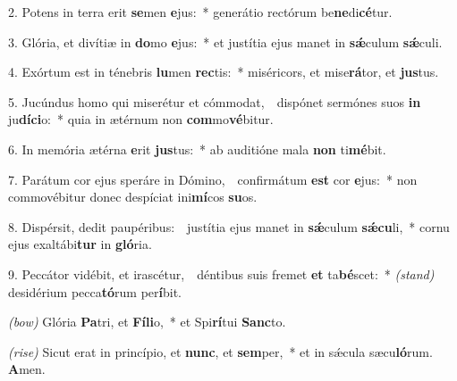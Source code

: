 2. Potens in terra erit \textbf{se}men \textbf{e}jus:~* generátio rectórum be\textbf{ne}di\textbf{cé}tur.

3. Glória, et divítiæ in \textbf{do}mo \textbf{e}jus:~* et justítia ejus manet in \textbf{s\'{\ae}}culum \textbf{s\'{\ae}}culi.

4. Exórtum est in ténebris \textbf{lu}men \textbf{rec}tis:~* miséricors, et mise\textbf{rá}tor, et \textbf{jus}tus.

5. Jucúndus homo qui miserétur et cómmodat,~\GreDagger\ dispónet sermónes suos \textbf{in} ju\textbf{dí}\textbf{ci}o:~* quia in ætérnum non \textbf{com}mo\textbf{vé}bitur.

6. In memória ætérna \textbf{e}rit \textbf{jus}tus:~* ab auditióne mala \textbf{non} ti\textbf{mé}bit.

7. Parátum cor ejus speráre in Dómino,~\GreDagger\ confirmátum \textbf{est} cor \textbf{e}jus:~* non commovébitur donec despíciat ini\textbf{mí}cos \textbf{su}os.

8. Dispérsit, dedit paupéribus:~\GreDagger\ justítia ejus manet in \textbf{s\'{\ae}}culum \textbf{s\'{\ae}}\-\textbf{cu}li,~* cornu ejus exaltábi\textbf{tur} in \textbf{gló}ria.

9. Peccátor vidébit, et irascétur,~\GreDagger\ déntibus suis fremet \textbf{et} ta\textbf{bé}scet:~* {\color{red}\textit{(stand)}} desidérium pecca\textbf{tó}rum per\textbf{í}bit.

{\color{red}\textit{(bow)}} Glória \textbf{Pa}tri, et \textbf{Fí}\textbf{li}o,~* et Spi\textbf{rí}tui \textbf{Sanc}to.

{\color{red}\textit{(rise)}} Sicut erat in princípio, et \textbf{nunc}, et \textbf{sem}per,~* et in s\'{\ae}cula sæcu\textbf{ló}rum. \textbf{A}men.